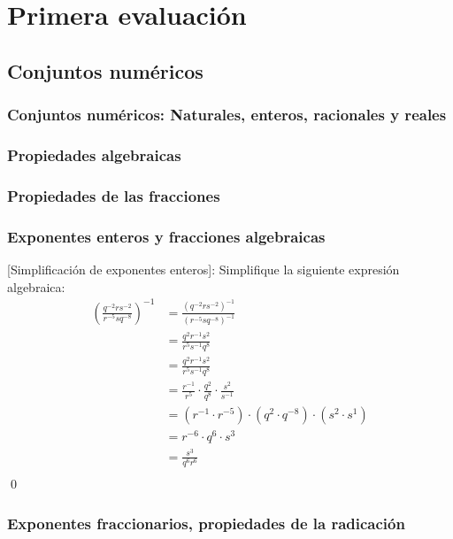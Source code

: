 \chapter{Primera evaluación}

\section{Conjuntos numéricos}

\subsection{Conjuntos numéricos: Naturales, enteros, racionales y reales}

\subsection{Propiedades algebraicas}

\subsection{Propiedades de las fracciones}


\subsection{Exponentes enteros y fracciones algebraicas}


	[Simplificación de exponentes enteros]: Simplifique la siguiente expresión algebraica:
	\begin{align}
		\left(\frac{q^{-2} r s^{-2}}{r^{-5} s q^{-8}}\right)^{-1}  
			&= \frac{(q^{-2} r s^{-2})^{-1}}{(r^{-5} s q^{-8})^{-1}} \\
			&= \frac{q^{2} r^{-1} s^{2}}{r^{5} s^{-1} q^{8}} \\
			&= \frac{q^{2} r^{-1} s^{2}}{r^{5} s^{-1} q^{8}} \\
			&= \frac{r^{-1}}{r^5} \cdot \frac{q^2}{q^8} \cdot \frac{s^2}{s^{-1}} \\
			&= (r^{-1} \cdot r^{-5}) \cdot (q^2 \cdot q^{-8}) \cdot (s^2 \cdot s^1) \\
			&= r^{-6} \cdot q^6 \cdot s^{3} \\
			&= \frac{s^3}{q^6 r^6} \\
	\end{align}
	\qed


\subsection{Exponentes fraccionarios, propiedades de la radicación}



